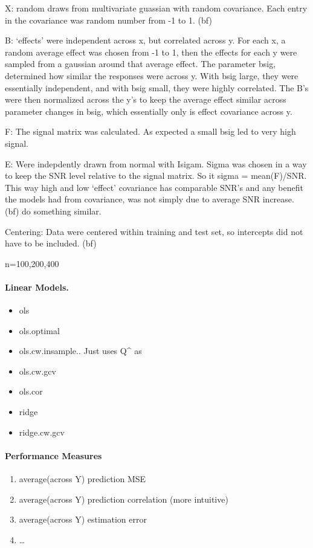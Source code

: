 \documentclass{article}
\begin{document}
X: random draws from multivariate guassian with random covariance. Each
entry in the covariance was random number from -1 to 1. (bf)

B: `effects' were independent across x, but correlated across y. For
each x, a random average effect was chosen from -1 to 1, then the
effects for each y were sampled from a gaussian around that average
effect. The parameter bsig, determined how similar the responses were
across y. With bsig large, they were essentially independent, and with
bsig small, they were highly correlated. The B's were then normalized
across the y's to keep the average effect similar across parameter
changes in bsig, which essentially only is effect covariance across y.

F: The signal matrix was calculated. As expected a small bsig led to
very high signal.

E: Were indepdently drawn from normal with Isigam. Sigma was chosen in a
way to keep the SNR level relative to the signal matrix. So it sigma =
mean(F)/SNR. This way high and low `effect' covariance has comparable
SNR's and any benefit the models had from covariance, was not simply due
to average SNR increase. (bf) do something similar.

Centering: Data were centered within training and test set, so
intercepts did not have to be included. (bf)

n=100,200,400

\paragraph{Linear Models.}\label{linear-models.}

\begin{itemize}
\item
  ols
\item
  ols.optimal
\item
  ols.cw.insample.. Just uses Q\^{} as
\item
  ols.cw.gcv
\item
  ols.cor
\item
  ridge
\item
  ridge.cw.gcv
\end{itemize}

\paragraph{Performance Measures}\label{performance-measures}

\begin{enumerate}
\def\labelenumi{\arabic{enumi}.}
\itemsep1pt\parskip0pt
\item
  average(across Y) prediction MSE
\item
  average(across Y) prediction correlation (more intuitive)
\item
  average(across Y) estimation error
\item
  \ldots{}
\end{enumerate}
\end{document}
